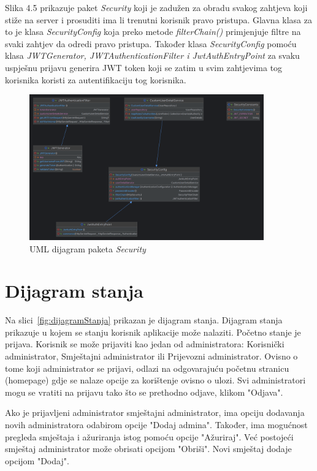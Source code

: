			Slika 4.5 prikazuje paket \textit{Security} koji je zadužen za obradu svakog zahtjeva koji stiže na server i prosuditi ima li trenutni korisnik pravo pristupa. Glavna klasa za to je klasa \textit{SecurityConfig} koja preko metode \textit{filterChain()} primjenjuje filtre na svaki zahtjev da odredi pravo pristupa. Također klasa \textit{SecurityConfig} pomoću klasa \textit{JWTGenerator, JWTAuthenticationFilter i JwtAuthEntryPoint} za svaku uspješnu prijavu generira JWT token koji se zatim u svim zahtjevima tog korisnika koristi za autentifikaciju tog korisnika.
			
			\begin{figure}[htbp]
				\centering
				\includegraphics[width=0.9\textwidth]{slike/securityUML}
				\caption{UML dijagram paketa \textit{Security}}
				\label{fig:securityUML}
			\end{figure}
			
			
			
			\eject
		
		\section{Dijagram stanja}
			
			
			Na slici~\ref{fig:dijagramStanja} prikazan je dijagram stanja. Dijagram stanja prikazuje u kojem se stanju korisnik aplikacije može nalaziti. Početno stanje je prijava. Korisnik se može prijaviti kao jedan od administratora: Korisnički administrator, Smještajni administrator ili Prijevozni administrator. Ovisno o tome koji administrator se prijavi, odlazi na odgovarajuću početnu stranicu (homepage) gdje se nalaze opcije za korištenje ovisno o ulozi. Svi administratori mogu se vratiti na prijavu tako što se prethodno odjave, klikom "Odjava".
			
			Ako je prijavljeni administrator smještajni administrator, ima opciju dodavanja novih administratora odabirom opcije "Dodaj admina". Također, ima mogućnost pregleda smještaja i ažuriranja istog pomoću opcije "Ažuriraj". Već postojeći smještaj administrator može obrisati opcijom "Obriši". Novi smještaj dodaje opcijom "Dodaj".
			
